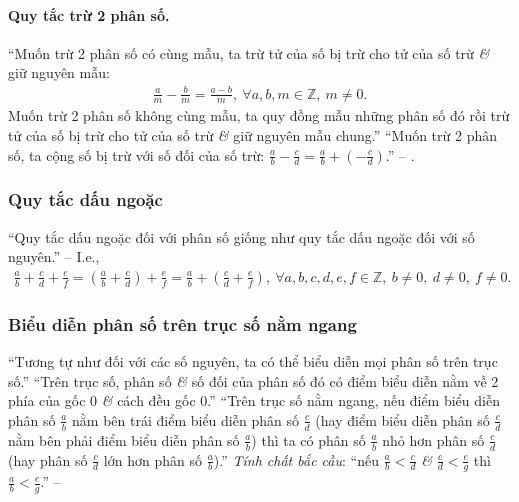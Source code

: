 \documentclass{article}
\numberwithin{equation}{section}
\begin{document}
\paragraph{Quy tắc trừ 2 phân số.} ``Muốn trừ 2 phân số có cùng mẫu, ta trừ tử của số bị trừ cho tử của số trừ \textit{\&} giữ nguyên mẫu:
\begin{align*}
	\frac{a}{m} - \frac{b}{m} = \frac{a - b}{m},\ \forall a,b,m\in\mathbb{Z},\ m\ne 0.
\end{align*}
Muốn trừ 2 phân số không cùng mẫu, ta quy đồng mẫu những phân số đó rồi trừ tử của số bị trừ cho tử của số trừ \textit{\&} giữ nguyên mẫu chung.'' ``Muốn trừ 2 phân số, ta cộng số bị trừ với số đối của số trừ: $\frac{a}{b} - \frac{c}{d} = \frac{a}{b} + \left(-\frac{c}{d}\right)$.'' -- \cite[pp. 36--37]{SGK_Toan_6_Canh_Dieu_tap_2}.

\subsubsection{Quy tắc dấu ngoặc}
``Quy tắc dấu ngoặc đối với phân số giống như quy tắc dấu ngoặc đối với số nguyên.'' -- \cite[p. 37]{SGK_Toan_6_Canh_Dieu_tap_2} I.e.,
\begin{align*}
	\frac{a}{b} + \frac{c}{d} + \frac{e}{f} = \left(\frac{a}{b} + \frac{c}{d}\right) + \frac{e}{f} = \frac{a}{b} + \left(\frac{c}{d} + \frac{e}{f}\right),\ \forall a,b,c,d,e,f\in\mathbb{Z},\ b\ne 0,\ d\ne 0,\ f\ne 0.
\end{align*}

\subsubsection{Biểu diễn phân số trên trục số nằm ngang}
``Tương tự như đối với các số nguyên, ta có thể biểu diễn mọi phân số trên trục số.'' ``Trên trục số, phân số \textit{\&} số đối của phân số đó có điểm biểu diễn nằm về 2 phía của gốc 0 \textit{\&} cách đều gốc 0.'' ``Trên trục số nằm ngang, nếu điểm biểu diễn phân số $\frac{a}{b}$ nằm bên trái điểm biểu diễn phân số $\frac{c}{d}$ (hay điểm biểu diễn phân số $\frac{c}{d}$ nằm bên phải điểm biểu diễn phân số $\frac{a}{b}$) thì ta có phân số $\frac{a}{b}$ nhỏ hơn phân số $\frac{c}{d}$ (hay phân số $\frac{c}{d}$ lớn hơn phân số $\frac{a}{b}$).'' \textit{Tính chất bắc cầu}: ``nếu $\frac{a}{b} < \frac{c}{d}$ \textit{\&} $\frac{c}{d} < \frac{e}{g}$ thì $\frac{a}{b} < \frac{e}{g}$.'' -- \cite[p. 39]{SGK_Toan_6_Canh_Dieu_tap_2}

\end{document}
